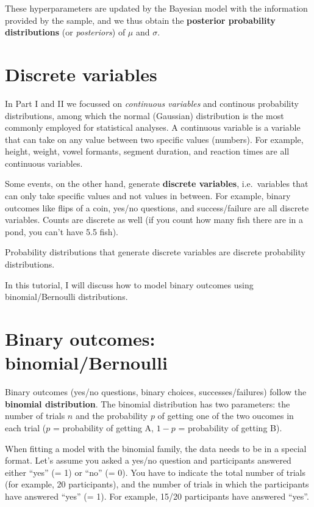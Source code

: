 \documentclass[
]{article}
\begin{document}
These hyperparameters are updated by the Bayesian model with the
information provided by the sample, and we thus obtain the
\textbf{posterior probability distributions} (or \emph{posteriors}) of
\(\mu\) and \(\sigma\).

\hypertarget{discrete-variables}{%
\section{Discrete variables}\label{discrete-variables}}

In Part I and II we focussed on \emph{continuous variables} and
continous probability distributions, among which the normal (Gaussian)
distribution is the most commonly employed for statistical analyses. A
continuous variable is a variable that can take on any value between two
specific values (numbers). For example, height, weight, vowel formants,
segment duration, and reaction times are all continuous variables.

Some events, on the other hand, generate \textbf{discrete variables},
i.e.~variables that can only take specific values and not values in
between. For example, binary outcomes like flips of a coin, yes/no
questions, and success/failure are all discrete variables. Counts are
discrete as well (if you count how many fish there are in a pond, you
can't have 5.5 fish).

Probability distributions that generate discrete variables are discrete
probability distributions.

In this tutorial, I will discuss how to model binary outcomes using
binomial/Bernoulli distributions.

\hypertarget{binary-outcomes-binomialbernoulli}{%
\section{Binary outcomes:
binomial/Bernoulli}\label{binary-outcomes-binomialbernoulli}}

Binary outcomes (yes/no questions, binary choices, successes/failures)
follow the \textbf{binomial distribution}. The binomial distribution has
two parameters: the number of trials \(n\) and the probability \(p\) of
getting one of the two oucomes in each trial (\(p\) = probability of
getting A, \(1 - p\) = probability of getting B).

When fitting a model with the binomial family, the data needs to be in a
special format. Let's assume you asked a yes/no question and
participants answered either ``yes'' (= 1) or ``no'' (= 0). You have to
indicate the total number of trials (for example, 20 participants), and
the number of trials in which the participants have answered ``yes'' (=
1). For example, 15/20 participants have answered ``yes''.
\end{document}
